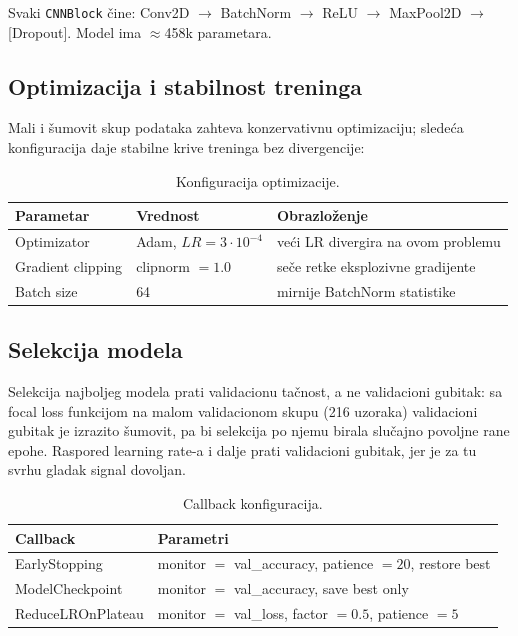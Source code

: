 \documentclass[12pt,a4paper]{article}
\begin{document}
Svaki \texttt{CNNBlock} čine: Conv2D $\rightarrow$ BatchNorm $\rightarrow$
ReLU $\rightarrow$ MaxPool2D $\rightarrow$ [Dropout]. Model ima
$\approx$458k parametara.

\subsection{Optimizacija i stabilnost treninga}

Mali i šumovit skup podataka zahteva konzervativnu optimizaciju; sledeća
konfiguracija daje stabilne krive treninga bez divergencije:

\begin{table}[H]
\centering
\begin{tabular}{lll}
\toprule
Parametar & Vrednost & Obrazloženje \\
\midrule
Optimizator       & Adam, $LR = 3\cdot10^{-4}$ & veći LR divergira na ovom problemu \\
Gradient clipping & clipnorm $=1.0$ & seče retke eksplozivne gradijente \\
Batch size        & 64 & mirnije BatchNorm statistike \\
\bottomrule
\end{tabular}
\caption{Konfiguracija optimizacije.}
\end{table}

\subsection{Selekcija modela}

Selekcija najboljeg modela prati validacionu tačnost, a ne validacioni
gubitak: sa focal loss funkcijom na malom validacionom skupu (216 uzoraka)
validacioni gubitak je izrazito šumovit, pa bi selekcija po njemu birala
slučajno povoljne rane epohe. Raspored learning rate-a i dalje prati
validacioni gubitak, jer je za tu svrhu gladak signal dovoljan.

\begin{table}[H]
\centering
\begin{tabular}{ll}
\toprule
Callback & Parametri \\
\midrule
EarlyStopping     & monitor $=$ val\_accuracy, patience $= 20$, restore best \\
ModelCheckpoint   & monitor $=$ val\_accuracy, save best only \\
ReduceLROnPlateau & monitor $=$ val\_loss, factor $= 0.5$, patience $= 5$ \\
\bottomrule
\end{tabular}
\caption{Callback konfiguracija.}
\end{table}
\end{document}

